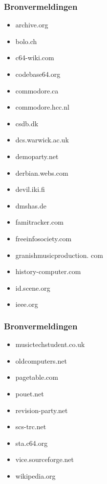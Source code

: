 
\begin{frame}[noframenumbering]
\frametitle{Bronvermeldingen}

\begin{multicols}{2}
\begin{itemize}
\item archive.org
\item bolo.ch
\item c64-wiki.com
\item codebase64.org
\item commodore.ca
\item commodore.hcc.nl
\item csdb.dk
\item dcs.warwick.ac.uk
\item demoparty.net
\item derbian.webs.com
\item devil.iki.fi
\item dmshas.de
\item famitracker.com
\item freeinfosociety.com
\item granishmusicproduction. com
\item history-computer.com
\item id.scene.org
\item ieee.org
\end{itemize}
\end{multicols}

\end{frame}


\begin{frame}[noframenumbering]
\frametitle{Bronvermeldingen}

\begin{multicols}{2}
\begin{itemize}
\item musictechstudent.co.uk
\item oldcomputers.net
\item pagetable.com
\item pouet.net
\item revision-party.net
\item scs-trc.net
\item sta.c64.org
\item vice.sourceforge.net
\item wikipedia.org
\end{itemize}
\end{multicols}

\end{frame}

